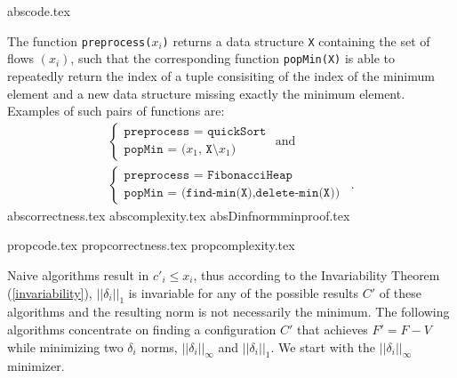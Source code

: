 \documentclass[11pt]{llncs}
\begin{document}
  {abscode.tex}

  The function \texttt{preprocess(}$x_i$\texttt{)} returns a data structure \texttt{X} containing the set of flows
  $\left(x_i\right)$, such that the corresponding function \texttt{popMin(X)} is able to repeatedly return the index of a
  tuple consisiting of the index of the minimum element and a new data structure missing exactly the minimum element.
  Examples of such pairs of functions are:
  \begin{equation*}
  \begin{gathered}
    \begin{cases}
      \texttt{preprocess = quickSort} \\
      \texttt{popMin = (}x_1\texttt{, X}\setminus x_1\texttt{)}
    \end{cases}
    \mbox{ and} \\
    \begin{cases}
      \texttt{preprocess = FibonacciHeap} \\
      \texttt{popMin = (find-min(X),delete-min(X))}
    \end{cases} \enspace.
  \end{gathered}
  \end{equation*}
  {abscorrectness.tex}
  {abscomplexity.tex}
  {absDinfnormminproof.tex}

  {propcode.tex}
  {propcorrectness.tex}
  {propcomplexity.tex}

  Naive algorithms result in $c'_i \leq x_i$, thus according to the Invariability Theorem (\ref{invariability}),
  $||\delta_i||_1$ is invariable for any of the possible results $C'$ of these algorithms and the resulting norm is not
  necessarily the minimum. The following algorithms concentrate on finding a configuration $C'$ that achieves $F' = F - V$
  while minimizing two $\delta_i$ norms, $||\delta_i||_\infty$ and $||\delta_i||_1$. We start with the
  $||\delta_i||_\infty$ minimizer.
\end{document}
